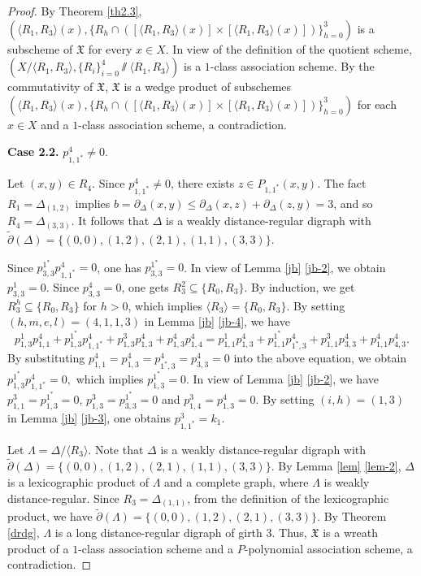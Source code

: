 \documentclass[12pt,a4paper]{amsart}
\theoremstyle{definition}
\begin{document}
\begin{proof}
By Theorem \ref{th2.3}, $(\langle R_1,R_3\rangle(x),\{R_h\cap([\langle R_1,R_3\rangle(x)]\times [\langle R_1,R_3\rangle(x)])\}_{h=0}^3)$ is a subscheme of $\mathfrak{X}$ for every $x\in X$. In view of the definition of the quotient scheme, $(X/\langle R_1,R_3\rangle, \{R_i\}_{i=0}^4 \sslash \langle R_1,R_3\rangle)$ is a $1$-class association scheme. By the commutativity of $\mathfrak{X}$, $\mathfrak{X}$ is a wedge product of subschemes $(\langle R_1,R_3\rangle(x),\{R_h\cap([\langle R_1,R_3\rangle(x)]\times [\langle R_1,R_3\rangle(x)])\}_{h=0}^3)$ for each $x\in X$ and a $1$-class association scheme, a contradiction.

\textbf{Case 2.2.} $p_{1,1^{*}}^{4}\neq 0$.

Let $(x,y)\in R_4$. Since $p_{1,1^{*}}^{4}\neq 0$, there exists $z\in P_{1,1^*}(x,y)$. The fact $R_1=\Delta_{(1,2)}$ implies $b=\partial_{\Delta}(x,y)\leq \partial_{\Delta}(x,z)+\partial_{\Delta}(z,y)=3$, and so $R_4=\Delta_{(3,3)}$. It follows that $\Delta$ is a weakly distance-regular digraph with $\tilde{\partial}(\Delta)=\{(0,0),(1,2),(2,1),(1,1),(3,3)\}$.

Since $p_{3,3}^{1^{*}}p_{1,1^{*}}^{4}=0$, one has $p_{3,3}^{1^{*}}=0$. In view of Lemma \ref{jb} \ref{jb-2}, we obtain $p_{3,3}^{1}=0$. Since $p_{3,3}^{4}=0$, one gets $R_3^2\subseteq\{R_0,R_3\}$. By induction, we get $R_3^h\subseteq\{R_0,R_3\}$ for $h>0$, which implies $\langle R_3\rangle =\{R_0,R_3\}$. By setting $(h,m,e,l)=(4,1,1,3)$ in Lemma \ref{jb} \ref{jb-4}, we have $$p_{1,3}^{1}p_{1,1}^{4}+p_{1,3}^{1^{*}}p_{1,1^{*}}^{4}+p_{1,3}^{3}p_{1,3}^{4}+p_{1,3}^{4}p_{1,4}^{4}=p_{1,1}^{1}p_{1,3}^{4}+p_{1,1}^{1^{*}}p_{1^{*},3}^{4}+p_{1,1}^{3}p_{3,3}^{4}+p_{1,1}^{4}p_{4,3}^{4}.$$
By substituting $p_{1,1}^{4}=p_{1,3}^{4}=p_{1^{*},3}^{4}=p_{3,3}^{4}=0$ into the above equation, we obtain $p_{1,3}^{1^{*}}p_{1,1^{*}}^{4}=0,$
which implies $p_{1,3}^{1^{*}}=0$. In view of Lemma \ref{jb} \ref{jb-2}, we have $p_{1,1}^{3}=p_{1,3}^{1^{*}}=0$, $p_{1,3}^3=p_{3,3}^{1^{*}}=0$ and $p_{1,4}^3=p_{1,3}^4=0$. By setting $(i,h)=(1,3)$ in Lemma \ref{jb} \ref{jb-3}, one obtains $p_{1,1^{*}}^{3}=k_1$.

Let $\Lambda=\Delta/\langle R_3\rangle$. Note that $\Delta$ is a weakly distance-regular digraph with $\tilde{\partial}(\Delta)=\{(0,0),(1,2),(2,1),(1,1),(3,3)\}$. By Lemma \ref{lem} \ref{lem-2}, $\Delta$ is a lexicographic product of $\Lambda$ and a complete graph, where $\Lambda$ is weakly distance-regular. Since $R_3=\Delta_{(1,1)}$, from the definition of the lexicographic product, we have $\tilde{\partial}(\Lambda)=\{(0,0),(1,2),(2,1),(3,3)\}$. By Theorem \ref{drdg}, $\Lambda$ is a long distance-regular digraph of girth $3$. Thus, $\mathfrak{X}$ is a wreath product of a $1$-class association scheme and a $P$-polynomial association scheme, a contradiction.
\end{proof}
\end{document}
